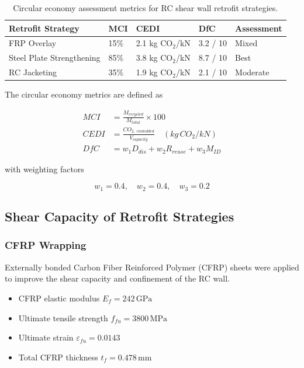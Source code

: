 \documentclass[fleqn,10pt]{wlscirep}
\begin{document}
\begin{table}[htbp]
\centering
\caption{Circular economy assessment metrics for RC shear wall retrofit strategies.}
\label{tab:circular_metrics}
\renewcommand{\arraystretch}{1.35}
\begin{tabular}{|p{3.2cm}|p{3.5cm}|p{3.8cm}|p{3.5cm}|p{2.5cm}|}
\hline
\textbf{Retrofit Strategy} & \textbf{MCI} & \textbf{CEDI} & \textbf{DfC} & \textbf{Assessment} \\
\hline
FRP Overlay & 15\% & 2.1 kg CO$_2$/kN & 3.2 / 10 & Mixed \\
\hline
Steel Plate Strengthening & 85\% & 3.8 kg CO$_2$/kN & 8.7 / 10 & Best \\
\hline
RC Jacketing & 35\% & 1.9 kg CO$_2$/kN & 2.1 / 10 & Moderate \\
\hline
\end{tabular}
\end{table}

The circular economy metrics are defined as

\begin{align}
MCI &= \frac{M_{recycled}}{M_{total}} \times 100 \\
CEDI &= \frac{CO_{2,\;embedded}}{V_{capacity}} \quad (kg\,CO_2/kN) \\
DfC &= w_1D_{dis} + w_2R_{reuse} + w_3M_{ID}
\end{align}

with weighting factors

\[
w_1 = 0.4, \quad w_2 = 0.4, \quad w_3 = 0.2
\]

\subsection{Shear Capacity of Retrofit Strategies}

\subsubsection{CFRP Wrapping}

Externally bonded Carbon Fiber Reinforced Polymer (CFRP) sheets were applied to improve the shear capacity and confinement of the RC wall.

\begin{itemize}
\item CFRP elastic modulus $E_f = 242\,\text{GPa}$
\item Ultimate tensile strength $f_{fu} = 3800\,\text{MPa}$
\item Ultimate strain $\varepsilon_{fu} = 0.0143$
\item Total CFRP thickness $t_f = 0.478\,\text{mm}$
\end{itemize}
\end{document}
